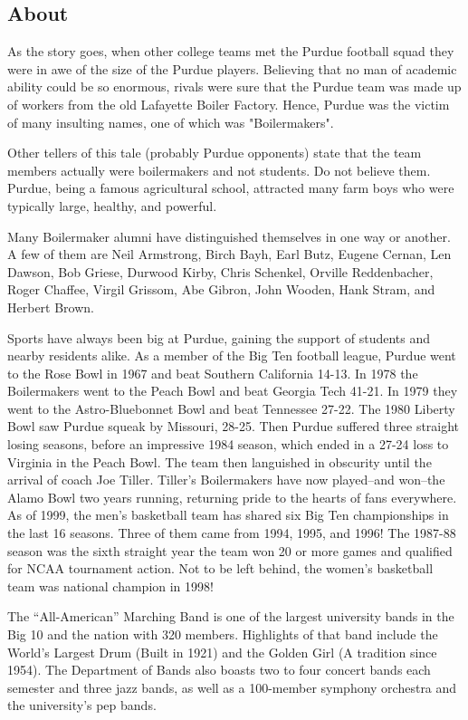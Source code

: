 \subsection{About}

As the story goes, when other college teams met the Purdue football squad they were in awe of the size of the Purdue players. Believing that no man of academic ability could be so enormous, rivals were sure that the Purdue team was made up of workers from the old Lafayette Boiler Factory. Hence, Purdue was the victim of many insulting names, one of which was "Boilermakers".

Other tellers of this tale (probably Purdue opponents) state that the team members actually were boilermakers and not students. Do not believe them. Purdue, being a famous agricultural school, attracted many farm boys who were typically large, healthy, and powerful.

Many Boilermaker alumni have distinguished themselves in one way or another. A few of them are Neil Armstrong, Birch Bayh, Earl Butz, Eugene Cernan, Len Dawson, Bob Griese, Durwood Kirby, Chris Schenkel, Orville Reddenbacher, Roger Chaffee, Virgil Grissom, Abe Gibron, John Wooden, Hank Stram, and Herbert Brown.

Sports have always been big at Purdue, gaining the support of students and nearby residents alike. As a member of the Big Ten football league, Purdue went to the Rose Bowl in 1967 and beat Southern California 14-13. In 1978 the Boilermakers went to the Peach Bowl and beat Georgia Tech 41-21. In 1979 they went to the Astro-Bluebonnet Bowl and beat Tennessee 27-22. The 1980 Liberty Bowl saw Purdue squeak by Missouri, 28-25. Then Purdue suffered three straight losing seasons, before an impressive 1984 season, which ended in a 27-24 loss to Virginia in the Peach Bowl. The team then languished in obscurity until the arrival of coach Joe Tiller. Tiller's Boilermakers have now played–and won–the Alamo Bowl two years running, returning pride to the hearts of fans everywhere. As of 1999, the men's basketball team has shared six Big Ten championships in the last 16 seasons. Three of them came from 1994, 1995, and 1996! The 1987-88 season was the sixth straight year the team won 20 or more games and qualified for NCAA tournament action. Not to be left behind, the women's basketball team was national champion in 1998!

The “All-American” Marching Band is one of the largest university bands in the Big 10 and the nation with 320 members. Highlights of that band include the World's Largest Drum (Built in 1921) and the Golden Girl (A tradition since 1954). The Department of Bands also boasts two to four concert bands each semester and three jazz bands, as well as a 100-member symphony orchestra and the university's pep bands.

